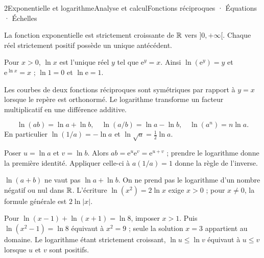 \begin{ouverture}[ln]{2}{Exponentielle et logarithme}{Analyse et calcul}{Fonctions réciproques · Équations · Échelles}
\end{ouverture}
\essentiel

La fonction exponentielle est strictement croissante de $\mathbb{R}$ vers $]0,+\infty[$. Chaque réel strictement positif possède un unique antécédent.
\begin{definition}
Pour $x>0$, $\ln x$ est l'unique réel $y$ tel que $\mathrm e^y=x$.
Ainsi $\ln(\mathrm e^y)=y$ et $\mathrm e^{\ln x}=x$ ; $\ln1=0$ et $\ln\mathrm e=1$.
\end{definition}
Les courbes de deux fonctions réciproques sont symétriques par rapport à $y=x$ lorsque le repère est orthonormé. Le logarithme transforme un facteur multiplicatif en une différence additive.
\begin{propriete}[Pour $a>0$, $b>0$ et $n\in\Z$]
\[\ln(ab)=\ln a+\ln b,\quad \ln(a/b)=\ln a-\ln b,\quad \ln(a^n)=n\ln a.\]
En particulier $\ln(1/a)=-\ln a$ et $\ln\sqrt a=\tfrac12\ln a$.
\end{propriete}
\begin{demonstration}
Poser $u=\ln a$ et $v=\ln b$. Alors $ab=\mathrm e^u\mathrm e^v=\mathrm e^{u+v}$ ; prendre le logarithme donne la première identité. Appliquer celle-ci à $a(1/a)=1$ donne la règle de l'inverse.
\end{demonstration}
\begin{attention}
$\ln(a+b)$ ne vaut pas $\ln a+\ln b$. On ne prend pas le logarithme d'un nombre négatif ou nul dans $\mathbb{R}$. L'écriture $\ln(x^2)=2\ln x$ exige $x>0$ ; pour $x\ne0$, la formule générale est $2\ln|x|$.
\end{attention}
\begin{savoirfaire}
Pour $\ln(x-1)+\ln(x+1)=\ln8$, imposer $x>1$.
Puis $\ln(x^2-1)=\ln8$ équivaut à $x^2=9$ ; seule la solution $x=3$ appartient au domaine.
Le logarithme étant strictement croissant, $\ln u\leq\ln v$ équivaut à $u\leq v$ lorsque $u$ et $v$ sont positifs.
\end{savoirfaire}
